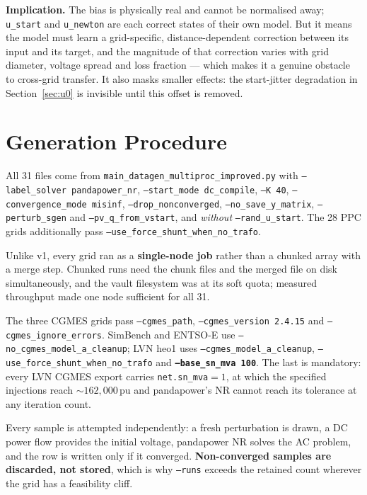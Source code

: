\documentclass{article}
\newcommand{\pu}{\,\text{pu}}
\begin{document}
\textbf{Implication.}  The bias is physically real and cannot be normalised
away; \texttt{u\_start} and \texttt{u\_newton} are each correct states of their
own model.  But it means the model must learn a grid-specific, distance-dependent
correction between its input and its target, and the magnitude of that
correction varies with grid diameter, voltage spread and loss fraction --- which
makes it a genuine obstacle to cross-grid transfer.  It also masks smaller
effects: the start-jitter degradation in Section~\ref{sec:u0} is invisible until
this offset is removed.


\section{Generation Procedure}

All 31 files come from \texttt{main\_datagen\_multiproc\_improved.py} with
\texttt{--label\_solver pandapower\_nr}, \texttt{--start\_mode dc\_compile},
\texttt{--K 40}, \texttt{--convergence\_mode misinf},
\texttt{--drop\_nonconverged}, \texttt{--no\_save\_y\_matrix},
\texttt{--perturb\_sgen} and \texttt{--pv\_q\_from\_vstart}, and \emph{without}
\texttt{--rand\_u\_start}.  The 28 PPC grids additionally pass
\texttt{--use\_force\_shunt\_when\_no\_trafo}.

Unlike v1, every grid ran as a \textbf{single-node job} rather than a chunked
array with a merge step.  Chunked runs need the chunk files and the merged file
on disk simultaneously, and the vault filesystem was at its soft quota; measured
throughput made one node sufficient for all 31.

The three CGMES grids pass \texttt{--cgmes\_path},
\texttt{--cgmes\_version 2.4.15} and \texttt{--cgmes\_ignore\_errors}.  SimBench
and ENTSO-E use \texttt{--no\_cgmes\_model\_a\_cleanup}; LVN heo1 uses
\texttt{--cgmes\_model\_a\_cleanup}, \texttt{--use\_force\_shunt\_when\_no\_trafo}
and \textbf{\texttt{--base\_sn\_mva 100}}.  The last is mandatory: every LVN
CGMES export carries \texttt{net.sn\_mva}${}=1$, at which the specified
injections reach ${\sim}162{,}000\pu$ and pandapower's NR cannot reach its
tolerance at any iteration count.

Every sample is attempted independently: a fresh perturbation is drawn, a DC
power flow provides the initial voltage, pandapower NR solves the AC problem,
and the row is written only if it converged.  \textbf{Non-converged samples are
discarded, not stored}, which is why \texttt{--runs} exceeds the retained count
wherever the grid has a feasibility cliff.
\end{document}
